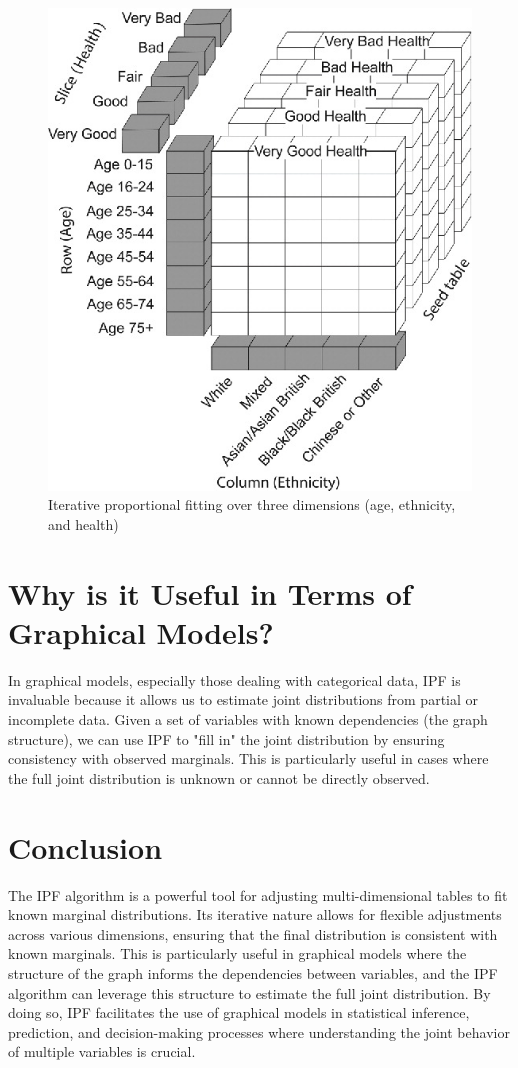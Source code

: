 \documentclass{article}
\begin{document}
\begin{figure}
    \centering
    \includegraphics[width=0.75\linewidth]{overviews/graphical-models/figures/rtpg_a_1099449_f0002_b.jpg}
    \caption{Iterative proportional fitting over three dimensions (age, ethnicity, and health)}
    \label{fig:enter-label}
\end{figure}

\section{Why is it Useful in Terms of Graphical Models?}

In graphical models, especially those dealing with categorical data, IPF is invaluable because it allows us to estimate joint distributions from partial or incomplete data. Given a set of variables with known dependencies (the graph structure), we can use IPF to "fill in" the joint distribution by ensuring consistency with observed marginals. This is particularly useful in cases where the full joint distribution is unknown or cannot be directly observed.

\section{Conclusion}

The IPF algorithm is a powerful tool for adjusting multi-dimensional tables to fit known marginal distributions. Its iterative nature allows for flexible adjustments across various dimensions, ensuring that the final distribution is consistent with known marginals. This is particularly useful in graphical models where the structure of the graph informs the dependencies between variables, and the IPF algorithm can leverage this structure to estimate the full joint distribution. By doing so, IPF facilitates the use of graphical models in statistical inference, prediction, and decision-making processes where understanding the joint behavior of multiple variables is crucial.
\end{document}
